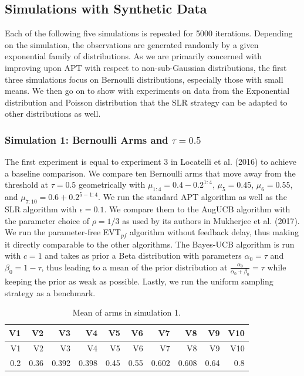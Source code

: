 \documentclass[11pt,]{article}
\begin{document}
\subsection{\texorpdfstring{Simulations with Synthetic Data
\label{sec:SyntheticData}}{Simulations with Synthetic Data }}\label{simulations-with-synthetic-data}

Each of the following five simulations is repeated for 5000 iterations.
Depending on the simulation, the observations are generated randomly by
a given exponential family of distributions. As we are primarily
concerned with improving upon APT with respect to non-sub-Gaussian
distributions, the first three simulations focus on Bernoulli
distributions, especially those with small means. We then go on to show
with experiments on data from the Exponential distribution and Poisson
distribution that the SLR strategy can be adapted to other distributions
as well.

\subsubsection{\texorpdfstring{Simulation 1: Bernoulli Arms and
\(\tau = 0.5\)}{Simulation 1: Bernoulli Arms and \textbackslash{}tau = 0.5}}\label{simulation-1-bernoulli-arms-and-tau-0.5}

The first experiment is equal to experiment 3 in Locatelli et al. (2016)
to achieve a baseline comparison. We compare ten Bernoulli arms that
move away from the threshold at \(\tau = 0.5\) geometrically with
\(\mu_{1:4} = 0.4-0.2^{1:4}\), \(\mu_5 = 0.45\), \(\mu_6 = 0.55\), and
\(\mu_{7:10} = 0.6 + 0.2^{5-1:4}\). We run the standard APT algorithm as
well as the SLR algorithm with \(\epsilon = 0.1\). We compare them to
the AugUCB algorithm with the parameter choice of \(\rho = 1/3\) as used
by its authors in Mukherjee et al. (2017). We run the parameter-free
EVT\(_{pf}\) algorithm without feedback delay, thus making it directly
comparable to the other algorithms. The Bayes-UCB algorithm is run with
\(c=1\) and takes as prior a Beta distribution with parameters
\(\alpha_0 = \tau\) and \(\beta_0 = 1 - \tau\), thus leading to a mean
of the prior distribution at \(\frac{\alpha_0}{\alpha_0+\beta_0}=\tau\)
while keeping the prior as weak as possible. Lastly, we run the uniform
sampling strategy as a benchmark.

\begin{longtable}[]{@{}rrrrrrrrrr@{}}
\caption{Mean of arms in simulation 1.}\tabularnewline
\toprule
V1 & V2 & V3 & V4 & V5 & V6 & V7 & V8 & V9 & V10\tabularnewline
\midrule
\endfirsthead
\toprule
V1 & V2 & V3 & V4 & V5 & V6 & V7 & V8 & V9 & V10\tabularnewline
\midrule
\endhead
0.2 & 0.36 & 0.392 & 0.398 & 0.45 & 0.55 & 0.602 & 0.608 & 0.64 &
0.8\tabularnewline
\bottomrule
\end{longtable}
\end{document}
